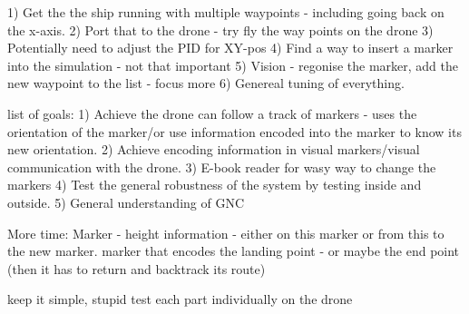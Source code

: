

1) Get the the ship running with multiple waypoints - including going back on the x-axis. 
2) Port that to the drone - try fly the way points on the drone
3) Potentially need to adjust the PID for XY-pos 
4) Find a way to insert a marker into the simulation - not that important
5) Vision - regonise the marker, add the new waypoint to the list - focus more
6) Genereal tuning of everything. 



list of goals: 
1) Achieve the drone can follow a track of markers - uses the orientation of the marker/or use information encoded into the marker to know its new orientation.  
2) Achieve encoding information in visual markers/visual communication with  the drone.
3) E-book reader for wasy way to change the markers 
4) Test the general robustness of the system by testing inside and outside. 
5) General understanding of GNC 


More time: 
Marker - height information - either on this marker or from this to the new marker.
marker that encodes the landing point - or maybe the end point (then it has to return and backtrack its route)  

keep it simple, stupid
test each part individually on the drone
